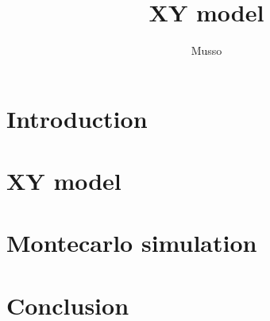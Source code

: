 \documentclass[12pt,twoside,openany]{report}
\title{XY model}
\author{Musso}
\date{}
\begin{document}
\maketitle
\tableofcontents


\chapter{Introduction}



\chapter{XY model}



\chapter{Montecarlo simulation}



\chapter{Conclusion}

\end{document}
